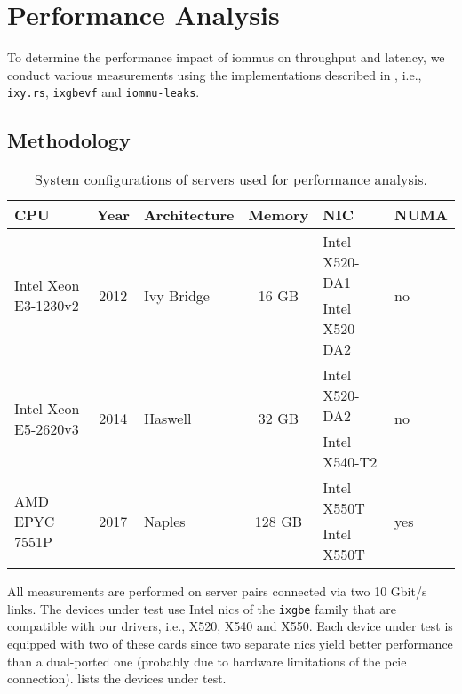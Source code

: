 \chapter{Performance Analysis}
\label{chap:performance_analysis}

To determine the performance impact of \acp{iommu} on throughput and latency, we
conduct various measurements using the implementations described in
, i.e., \texttt{ixy.rs}, \texttt{ixgbevf} and
\texttt{iommu-leaks}.


\section{Methodology}
\label{sec:methodology}

\begin{table}
    \centering
    \begin{tabular}{l|c|l|c|l|l}
    CPU & Year & Architecture & Memory & NIC & NUMA  \\ \hline

    \multirow{2}{*}{Intel Xeon E3-1230v2} & \multirow{2}{*}{2012} &
    \multirow{2}{*}{Ivy Bridge} & \multirow{2}{*}{16 GB} & Intel X520-DA1 &
    \multirow{2}{*}{no} \\
    & & & & Intel X520-DA2 & \\ \hline

    \multirow{2}{*}{Intel Xeon E5-2620v3} & \multirow{2}{*}{2014} &
    \multirow{2}{*}{Haswell} & \multirow{2}{*}{32 GB} & Intel X520-DA2 &
    \multirow{2}{*}{no} \\
    & & & & Intel X540-T2 & \\ \hline

    \multirow{2}{*}{AMD EPYC 7551P} & \multirow{2}{*}{2017} &
    \multirow{2}{*}{Naples} & \multirow{2}{*}{128 GB} & Intel X550T &
    \multirow{2}{*}{yes} \\
    & & & & Intel X550T & \\
    \end{tabular}

    \caption{System configurations of servers used for performance analysis.}
    \label{tab:servers}
\end{table}

All measurements are performed on server pairs connected via two 10 Gbit/s
links. The devices under test use Intel \acp{nic} of the \texttt{ixgbe} family
that are compatible with our drivers, i.e., X520, X540 and X550. Each device
under test is equipped with two of these cards since two separate \acp{nic}
yield better performance than a dual-ported one (probably due to hardware
limitations of the \ac{pcie} connection).  lists the devices
under test.

